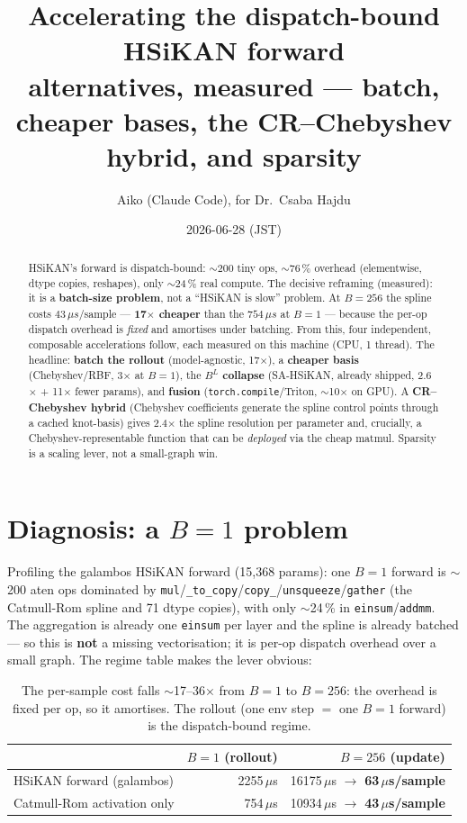 \documentclass[11pt]{article}
\title{\textbf{Accelerating the dispatch-bound HSiKAN forward}\\[2pt]
\large alternatives, measured --- batch, cheaper bases, the CR--Chebyshev hybrid, and sparsity}
\author{Aiko (Claude Code), for Dr.\ Csaba Hajdu}
\date{2026-06-28 (JST)}
\begin{document}
\maketitle

\begin{abstract}
\noindent HSiKAN's forward is dispatch-bound: $\sim$200 tiny ops, $\sim$76\,\% overhead (elementwise, dtype
copies, reshapes), only $\sim$24\,\% real compute. The decisive reframing (measured): it is a \textbf{batch-size
problem}, not a ``HSiKAN is slow'' problem. At $B{=}256$ the spline costs $43\,\mu s$/sample --- \textbf{17$\times$
cheaper} than the $754\,\mu s$ at $B{=}1$ --- because the per-op dispatch overhead is \emph{fixed} and amortises
under batching. From this, four independent, composable accelerations follow, each measured on this machine (CPU,
1 thread). The headline: \textbf{batch the rollout} (model-agnostic, 17$\times$), a \textbf{cheaper basis}
(Chebyshev/RBF, 3$\times$ at $B{=}1$), the \textbf{$B^{L}$ collapse} (SA-HSiKAN, already shipped, 2.6$\times$ +
11$\times$ fewer params), and \textbf{fusion} (\texttt{torch.compile}/Triton, $\sim$10$\times$ on GPU). A
\textbf{CR--Chebyshev hybrid} (Chebyshev coefficients generate the spline control points through a cached
knot-basis) gives 2.4$\times$ the spline resolution per parameter and, crucially, a Chebyshev-representable function
that can be \emph{deployed} via the cheap matmul. Sparsity is a scaling lever, not a small-graph win.
\end{abstract}

\section{Diagnosis: a $B{=}1$ problem}
Profiling the galambos HSiKAN forward (15{,}368 params): one $B{=}1$ forward is $\sim$200 aten ops dominated by
\texttt{mul}/\texttt{\_to\_copy}/\texttt{copy\_}/\texttt{unsqueeze}/\texttt{gather} (the Catmull-Rom spline and
71 dtype copies), with only $\sim$24\,\% in \texttt{einsum}/\texttt{addmm}. The aggregation is already one
\texttt{einsum} per layer and the spline is already batched --- so this is \textbf{not} a missing vectorisation;
it is per-op dispatch overhead over a small graph. The regime table makes the lever obvious:

\begin{table}[h]\centering
\begin{tabular}{lrr}
\toprule
 & $B{=}1$ (rollout) & $B{=}256$ (update) \\
\midrule
HSiKAN forward (galambos) & 2255\,$\mu$s & 16175\,$\mu$s $\to$ \textbf{63\,$\mu$s/sample} \\
Catmull-Rom activation only & 754\,$\mu$s & 10934\,$\mu$s $\to$ \textbf{43\,$\mu$s/sample} \\
\bottomrule
\end{tabular}
\caption{The per-sample cost falls $\sim$17--36$\times$ from $B{=}1$ to $B{=}256$: the overhead is fixed per op,
so it amortises. The rollout (one env step $=$ one $B{=}1$ forward) is the dispatch-bound regime.}
\end{table}
\end{document}
